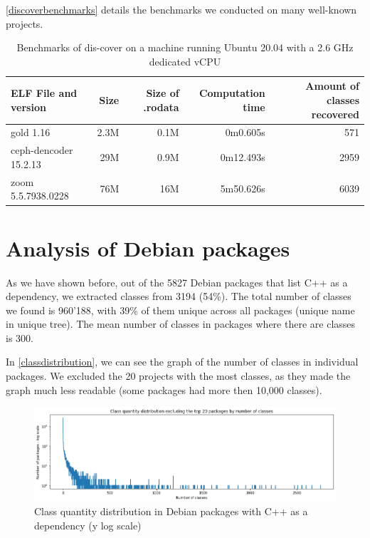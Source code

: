 \documentclass[a4paper,11pt,oneside]{report}
\begin{document}
\autoref{discoverbenchmarks} details the benchmarks we conducted on many 
well-known projects.

\begin{table}[h]
  \centering
  {\small
  \begin{tabular}{l | r | r | r | r }
    ELF File and version & Size & Size of .rodata & Computation time & Amount 
of classes recovered  \\
    \hline
    gold 1.16 & 2.3M & 0.1M & 0m0.605s & 571 \\
    ceph-dencoder 15.2.13 & 29M & 0.9M & 0m12.493s & 2959 \\
    zoom 5.5.7938.0228 & 76M & 16M & 5m50.626s & 6039 
  \end{tabular}
  }

\caption{Benchmarks of dis-cover on a machine running Ubuntu 20.04 with a 2.6 
GHz dedicated vCPU}
\label{discoverbenchmarks}

\end{table}


\section{Analysis of Debian packages}
\label{debiansection}

As we have shown before, out of the 5827 Debian packages that list C++ as a 
dependency, we extracted classes from 3194 (54\%).
The total number of classes we found is 960'188, with 39\% of them unique 
across all packages (unique name in unique tree).
The mean number of classes in packages where there are classes is 300.

In \autoref{classdistribution}, we can see the graph of the number of classes
in individual packages. We excluded the 20 projects with the most classes, as
they made the graph much less readable (some packages had more then 10,000
classes).

\begin{figure}

\includegraphics[width=16cm]{package_distribution.png}
\caption{Class quantity distribution in Debian packages with C++ as a
dependency (y log scale)}
\label{classdistribution}

\end{figure}
\end{document}
